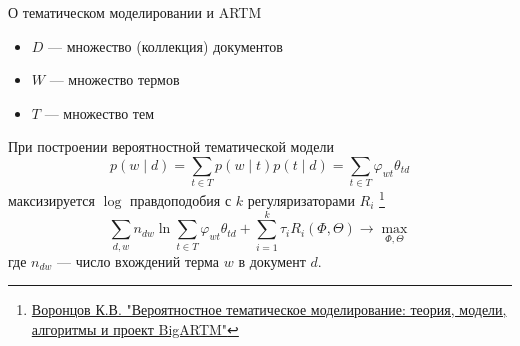 \documentclass{beamer}
\begin{document}
\begin{frame}{О тематическом моделировании и ARTM}
    \begin{itemize}
        \item $D$ — множество (коллекция) документов
        \item $W$ — множество термов
        \item $T$ — множество тем
    \end{itemize}

    При построении вероятностной тематической модели
    $$p (w \mid d) = \sum \limits_{t \in T} p (w \mid t) p (t \mid d) = \sum \limits_{t \in T} \varphi_{wt} \theta_{td}$$
    максизируется $\log$ правдоподобия с $k$ регуляризаторами $R_i$ \footnote{\href{http://www.machinelearning.ru/wiki/images/d/d5/Voron17survey-artm.pdf}{Воронцов К.В. "Вероятностное тематическое моделирование: теория, модели, алгоритмы и проект BigARTM"}}
    $$\sum \limits_{d, w} n_{dw} \ln \sum \limits_{t \in T} \varphi_{wt} \theta_{td} + \sum \limits_{i = 1}^k \tau_i R_i (\Phi, \Theta) \to \max \limits_{\Phi, \Theta}$$
    где $n_{dw}$ — число вхождений терма $w$ в документ $d$.
\end{frame}
\end{document}
